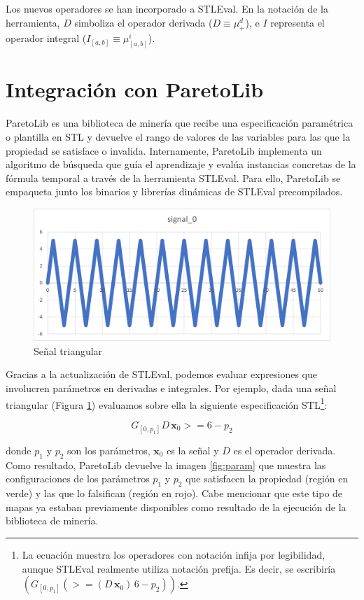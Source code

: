 Los nuevos operadores se han incorporado a STLEval. En la notación de la herramienta, $D$ simboliza el operador derivada ($D \equiv \mu^d_{+}$), e $I$ representa el operador integral ($I_[a,b] \equiv \mu^i_{[a,b]}$).

\section{Integración con ParetoLib}
ParetoLib \cite{FORMATS_19, ParetoLib} es una biblioteca de minería que recibe una especificación paramétrica o plantilla en STL y devuelve el rango de valores de las variables para las que la propiedad se satisface o invalida. Internamente, ParetoLib implementa un algoritmo de búsqueda que guía el aprendizaje y evalúa instancias concretas de la fórmula temporal a través de la herramienta STLEval. Para ello, ParetoLib se empaqueta junto los binarios y librerías dinámicas de STLEval precompilados.


\begin{figure}[htb]
\centering
  \includegraphics[width=0.7\linewidth]{images/triangular} 
\caption{Señal triangular}
\label{fig:trian}
\end{figure}

Gracias a la actualización de STLEval, podemos evaluar expresiones que involucren parámetros en derivadas e integrales. Por ejemplo, dada una señal triangular (Figura \ref{fig:trian}) evaluamos sobre ella la siguiente especificación STL\footnote{La ecuación muestra los operadores con notación infija por legibilidad, aunque STLEval realmente utiliza notación prefija. Es decir, se escribiría $(G_{[0,p_1]} (>= (D\, \mathbf{x}_0) \, 6 - p_2))$.}:


$$G_{[0,p_1]} D\, \mathbf{x}_0 >= 6 - p_2$$ 

donde $p_1$ y $p_2$ son los parámetros, $\mathbf{x}_0$ es la señal y $D$ es el operador derivada.
Como resultado, ParetoLib devuelve la imagen \ref{fig:param} que muestra las configuraciones de los parámetros $p_1$ y $p_2$ que satisfacen la propiedad (región en verde) y las que lo falsifican (región en rojo). %
Cabe mencionar que este tipo de mapas ya estaban previamente disponibles como resultado de la ejecución de la biblioteca de minería.

